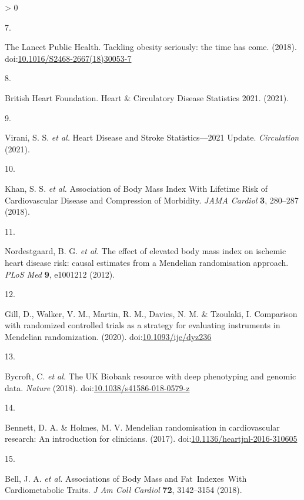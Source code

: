 \documentclass[11pt,twoside]{bristolthesis}
\newlength{\cslhangindent}
\newlength{\csllabelwidth}
\newenvironment{CSLReferences}[2] %
 {%
  \setlength{\parindent}{0pt}
  \ifodd #1 \everypar{\setlength{\hangindent}{\cslhangindent}}\ignorespaces\fi
  \ifnum #2 > 0
  \setlength{\parskip}{#2\baselineskip}
  \fi
 }%
 {}
\newcommand{\CSLLeftMargin}[1]{\parbox[t]{\csllabelwidth}{#1}}
\newcommand{\CSLRightInline}[1]{\parbox[t]{\linewidth - \csllabelwidth}{#1}\break}
\begin{document}
\begin{CSLReferences}{0}{0}
\leavevmode\hypertarget{ref-TheLancetPublicHealth2018}{}%
\CSLLeftMargin{7. }
\CSLRightInline{The Lancet Public Health. {Tackling obesity seriously: the time has come}. (2018). doi:\href{https://doi.org/10.1016/S2468-2667(18)30053-7}{10.1016/S2468-2667(18)30053-7}}

\leavevmode\hypertarget{ref-BritishHeartFoundation2021}{}%
\CSLLeftMargin{8. }
\CSLRightInline{British Heart Foundation. {Heart {\&} Circulatory Disease Statistics 2021}. (2021).}

\leavevmode\hypertarget{ref-Virani2021}{}%
\CSLLeftMargin{9. }
\CSLRightInline{Virani, S. S. \emph{et al.} {Heart Disease and Stroke Statistics---2021 Update}. \emph{Circulation} (2021).}

\leavevmode\hypertarget{ref-Khan2018}{}%
\CSLLeftMargin{10. }
\CSLRightInline{Khan, S. S. \emph{et al.} {Association of Body Mass Index With Lifetime Risk of Cardiovascular Disease and Compression of Morbidity}. \emph{JAMA Cardiol} \textbf{3}, 280--287 (2018).}

\leavevmode\hypertarget{ref-Nordestgaard2012}{}%
\CSLLeftMargin{11. }
\CSLRightInline{Nordestgaard, B. G. \emph{et al.} {The effect of elevated body mass index on ischemic heart disease risk: causal estimates from a Mendelian randomisation approach}. \emph{PLoS Med} \textbf{9}, e1001212 (2012).}

\leavevmode\hypertarget{ref-Gill2020}{}%
\CSLLeftMargin{12. }
\CSLRightInline{Gill, D., Walker, V. M., Martin, R. M., Davies, N. M. \& Tzoulaki, I. {Comparison with randomized controlled trials as a strategy for evaluating instruments in Mendelian randomization}. (2020). doi:\href{https://doi.org/10.1093/ije/dyz236}{10.1093/ije/dyz236}}

\leavevmode\hypertarget{ref-Bycroft2018}{}%
\CSLLeftMargin{13. }
\CSLRightInline{Bycroft, C. \emph{et al.} {The UK Biobank resource with deep phenotyping and genomic data}. \emph{Nature} (2018). doi:\href{https://doi.org/10.1038/s41586-018-0579-z}{10.1038/s41586-018-0579-z}}

\leavevmode\hypertarget{ref-Bennett2017}{}%
\CSLLeftMargin{14. }
\CSLRightInline{Bennett, D. A. \& Holmes, M. V. {Mendelian randomisation in cardiovascular research: An introduction for clinicians}. (2017). doi:\href{https://doi.org/10.1136/heartjnl-2016-310605}{10.1136/heartjnl-2016-310605}}

\leavevmode\hypertarget{ref-Bell2018}{}%
\CSLLeftMargin{15. }
\CSLRightInline{Bell, J. A. \emph{et al.} {Associations of Body Mass and Fat~Indexes~With Cardiometabolic Traits}. \emph{J Am Coll Cardiol} \textbf{72}, 3142--3154 (2018).}


\end{CSLReferences}
\end{document}
